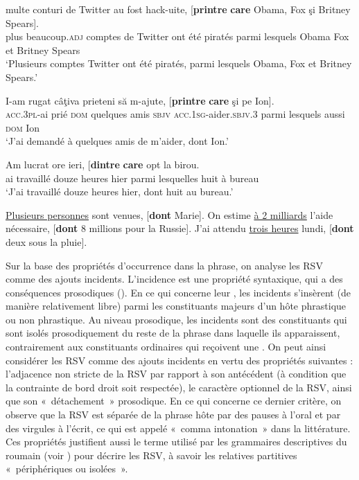 \ea \label{ch3:ex47} 
\ea
\gll {}  multe  conturi  de  Twitter  au  fost  hack-uite,  [\textbf{printre} \textbf{care} Obama,  Fox  şi  Britney  Spears]. \label{ch3:ex47a}\\
plus  beaucoup.\textsc{adj}  comptes  de  Twitter  ont  été  piratés  parmi  lesquels 
Obama  Fox  et  Britney  Spears \\
\glt ‘Plusieurs comptes Twitter ont été piratés, parmi lesquels Obama, Fox et Britney Spears.’

\ex
\gll I-am  rugat    câţiva  prieteni  să  m-ajute,  [\textbf{printre} \textbf{care}  şi  pe  Ion]. \label{ch3:ex47b}\\ 
\textsc{acc.3pl}{}-ai  prié  \textsc{dom} quelques  amis  \textsc{sbjv} \textsc{acc.1sg}{}-aider.\textsc{sbjv.3} parmi lesquels  aussi  \textsc{dom}  Ion \\
\glt ‘J’ai demandé à quelques amis de m’aider, dont Ion.’

\ex 
\gll Am  lucrat    ore  ieri,  [\textbf{dintre} \textbf{care}  opt  la  birou. \label{ch3:ex47c}\\
ai  travaillé  douze  heures  hier  parmi  lesquelles  huit  à  bureau \\
\glt ‘J’ai travaillé douze heures hier, dont huit au bureau.’
\z 
\z 


\ea \label{ch3:ex48} 
\ea
\uline{Plusieurs personnes} sont venues, [\textbf{dont} Marie]. \label{ch3:ex48a}
\ex 
On estime \uline{à 2 milliards} l’aide nécessaire, [\textbf{dont} 8 millions pour la Russie]. \label{ch3:ex48b}
\ex 
J’ai attendu \uline{trois heures} lundi, [\textbf{dont} deux sous la pluie]. \label{ch3:ex48c}
\z 
\z 

Sur la base des propriétés d’occurrence dans la phrase, on analyse les RSV comme des ajouts incidents. L’incidence est une propriété syntaxique, qui a des conséquences prosodiques (\citealt{BonamiEtAl2007,BonamiEtAl2008}). En ce qui concerne leur , les incidents s’insèrent (de manière relativement libre) par\-mi les constituants majeurs d’un hôte phrastique ou non phrastique. Au niveau prosodique, les incidents sont des constituants qui sont isolés prosodiquement du reste de la phrase dans laquelle ils apparaissent, contrairement aux constituants ordinaires qui reçoivent une . On peut ainsi considérer les RSV comme des ajouts incidents en vertu des propriétés suivantes : l’adjacence non stricte de la RSV par rapport à son antécédent (à condition que la contrainte de bord droit soit respectée), le caractère optionnel de la RSV, ainsi que son «~détachement~» prosodique. En ce qui concerne ce dernier critère, on observe que la RSV est séparée de la phrase hôte par des pauses à l’oral et par des virgules à l’écrit, ce qui est appelé «~comma intonation~» dans la littérature. Ces propriétés justifient aussi le terme utilisé par les grammaires descriptives du roumain (voir \citealt{Gheorghe2005}) pour décrire les RSV, à savoir les relatives partitives «~périphériques ou isolées~».


